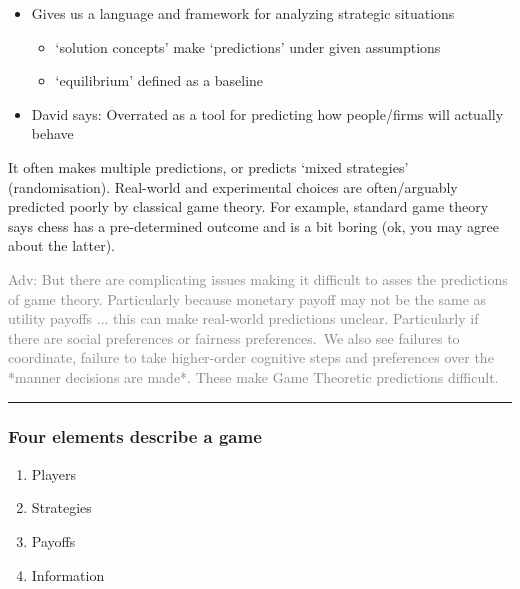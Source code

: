 \documentclass[]{article}
\providecommand{\tightlist}{%
  \setlength{\itemsep}{0pt}\setlength{\parskip}{0pt}}
\begin{document}
\begin{itemize}
\tightlist
\item
  Gives us a language and framework for analyzing strategic situations

  \begin{itemize}
  \tightlist
  \item
    `solution concepts' make `predictions' under given assumptions
  \item
    `equilibrium' defined as a baseline
  \end{itemize}
\item
  David says: Overrated as a tool for predicting how people/firms will actually behave
\end{itemize}

It often makes multiple predictions, or predicts `mixed strategies' (randomisation).
Real-world and experimental choices are often/arguably predicted poorly by classical game theory.
For example, standard game theory says chess has a pre-determined outcome and is a bit boring (ok, you may agree about the latter).

\textcolor{gray}{Adv: But there are complicating issues making it difficult to asses the predictions of game theory.
Particularly because monetary payoff may not be the same as utility payoffs ... this can make real-world predictions unclear.
Particularly if there are social preferences or fairness preferences.\
We also see failures to coordinate,
failure to take higher-order cognitive steps
and preferences over the *manner decisions are made*.
These make Game Theoretic predictions difficult.}

\begin{center}\rule{0.5\linewidth}{\linethickness}\end{center}

\hypertarget{four-elements-describe-a-game}{%
\subsubsection{Four elements describe a game}\label{four-elements-describe-a-game}}

\begin{enumerate}
\def\labelenumi{\arabic{enumi}.}
\tightlist
\item
  Players
\item
  Strategies
\item
  Payoffs
\item
  Information
\end{enumerate}
\end{document}
